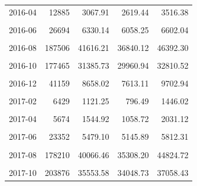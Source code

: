 \begin{longtable}[t]{crrrr}
2016-04 & 12885 & 3067.91 & 2619.44 & 3516.38\\
\cellcolor{gray!10}{2016-05} & \cellcolor{gray!10}{13881} & \cellcolor{gray!10}{3398.35} & \cellcolor{gray!10}{3077.93} & \cellcolor{gray!10}{3718.77}\\
2016-06 & 26694 & 6330.14 & 6058.25 & 6602.04\\
\cellcolor{gray!10}{2016-07} & \cellcolor{gray!10}{87442} & \cellcolor{gray!10}{17504.15} & \cellcolor{gray!10}{12735.48} & \cellcolor{gray!10}{22272.82}\\
2016-08 & 187506 & 41616.21 & 36840.12 & 46392.30\\
\cellcolor{gray!10}{2016-09} & \cellcolor{gray!10}{215313} & \cellcolor{gray!10}{42083.78} & \cellcolor{gray!10}{38413.66} & \cellcolor{gray!10}{45753.89}\\
2016-10 & 177465 & 31385.73 & 29960.94 & 32810.52\\
\cellcolor{gray!10}{2016-11} & \cellcolor{gray!10}{95867} & \cellcolor{gray!10}{19566.29} & \cellcolor{gray!10}{17782.10} & \cellcolor{gray!10}{21350.49}\\
2016-12 & 41159 & 8658.02 & 7613.11 & 9702.94\\
\cellcolor{gray!10}{2017-01} & \cellcolor{gray!10}{14234} & \cellcolor{gray!10}{2838.15} & \cellcolor{gray!10}{2400.85} & \cellcolor{gray!10}{3275.44}\\
2017-02 & 6429 & 1121.25 & 796.49 & 1446.02\\
\cellcolor{gray!10}{2017-03} & \cellcolor{gray!10}{6417} & \cellcolor{gray!10}{1564.69} & \cellcolor{gray!10}{1082.76} & \cellcolor{gray!10}{2046.62}\\
2017-04 & 5674 & 1544.92 & 1058.72 & 2031.12\\
\cellcolor{gray!10}{2017-05} & \cellcolor{gray!10}{10583} & \cellcolor{gray!10}{2533.19} & \cellcolor{gray!10}{2092.24} & \cellcolor{gray!10}{2974.15}\\
2017-06 & 23352 & 5479.10 & 5145.89 & 5812.31\\
\cellcolor{gray!10}{2017-07} & \cellcolor{gray!10}{72520} & \cellcolor{gray!10}{15860.77} & \cellcolor{gray!10}{12786.27} & \cellcolor{gray!10}{18935.26}\\
2017-08 & 178210 & 40066.46 & 35308.20 & 44824.72\\
\cellcolor{gray!10}{2017-09} & \cellcolor{gray!10}{368188} & \cellcolor{gray!10}{73822.96} & \cellcolor{gray!10}{68880.36} & \cellcolor{gray!10}{78765.57}\\
2017-10 & 203876 & 35553.58 & 34048.73 & 37058.43\\

\end{longtable}
